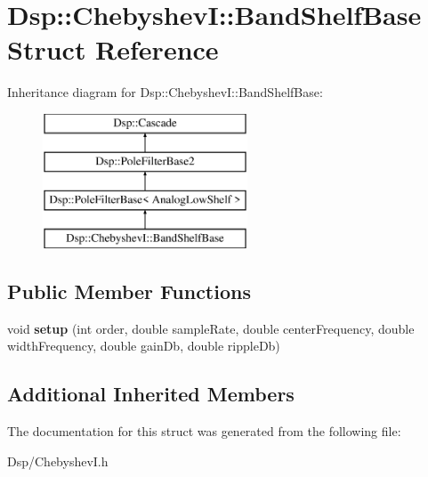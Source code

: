 \hypertarget{structDsp_1_1ChebyshevI_1_1BandShelfBase}{\section{Dsp\-:\-:Chebyshev\-I\-:\-:Band\-Shelf\-Base Struct Reference}
\label{structDsp_1_1ChebyshevI_1_1BandShelfBase}
}
Inheritance diagram for Dsp\-:\-:Chebyshev\-I\-:\-:Band\-Shelf\-Base\-:\begin{figure}[H]
\begin{center}
\leavevmode
\includegraphics[height=4.000000cm]{structDsp_1_1ChebyshevI_1_1BandShelfBase}
\end{center}
\end{figure}
\subsection*{Public Member Functions}
\begin{DoxyCompactItemize}
\item 
\hypertarget{structDsp_1_1ChebyshevI_1_1BandShelfBase_a1b1cf3adb8e874de369a4c1dab31f2f2}{void {\bfseries setup} (int order, double sample\-Rate, double center\-Frequency, double width\-Frequency, double gain\-Db, double ripple\-Db)}\label{structDsp_1_1ChebyshevI_1_1BandShelfBase_a1b1cf3adb8e874de369a4c1dab31f2f2}

\end{DoxyCompactItemize}
\subsection*{Additional Inherited Members}


The documentation for this struct was generated from the following file\-:\begin{DoxyCompactItemize}
\item 
Dsp/Chebyshev\-I.\-h\end{DoxyCompactItemize}
